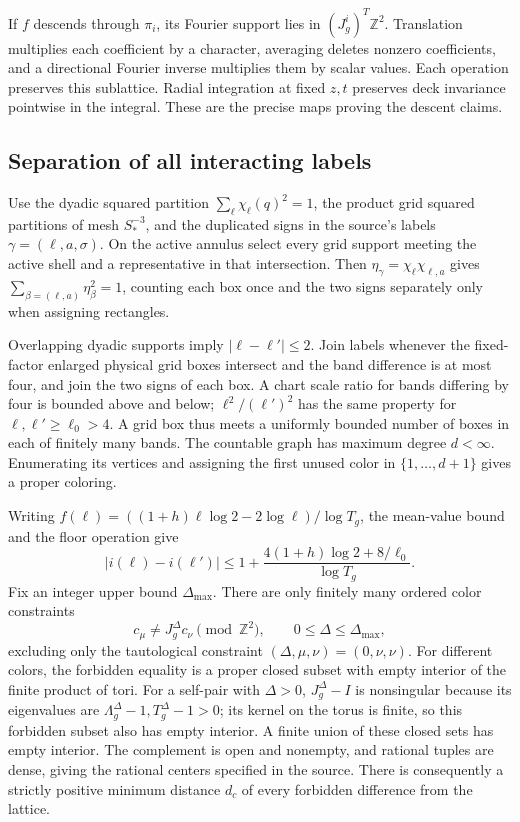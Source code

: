 \documentclass[10pt,a4paper]{article}
\newcounter{none}
\begin{document}
If \(f\) descends through \(\pi_i\), its Fourier support lies in \((J_g^i)^T\mathbb Z^2\). Translation multiplies each coefficient by a character, averaging deletes nonzero coefficients, and a directional Fourier inverse multiplies them by scalar values. Each operation preserves this sublattice. Radial integration at fixed \(z,t\) preserves deck invariance pointwise in the integral. These are the precise maps proving the descent claims.

\subsection{Separation of all interacting labels}\label{separation-of-all-interacting-labels}

Use the dyadic squared partition \(\sum_\ell\chi_\ell(q)^2=1\), the product grid squared partitions of mesh \(S_*^{-3}\), and the duplicated signs in the source's labels \(\gamma=(\ell,a,\sigma)\). On the active annulus select every grid support meeting the active shell and a representative in that intersection. Then \(\eta_\gamma=\chi_\ell\chi_{\ell,a}\) gives \(\sum_{\beta=(\ell,a)}\eta_\beta^2=1\), counting each box once and the two signs separately only when assigning rectangles.

Overlapping dyadic supports imply \(|\ell-\ell'|\le2\). Join labels whenever the fixed-factor enlarged physical grid boxes intersect and the band difference is at most four, and join the two signs of each box. A chart scale ratio for bands differing by four is bounded above and below; \(\ell^2/(\ell')^2\) has the same property for \(\ell,\ell'\ge\ell_0>4\). A grid box thus meets a uniformly bounded number of boxes in each of finitely many bands. The countable graph has maximum degree \(d<\infty\). Enumerating its vertices and assigning the first unused color in \(\{1,\ldots,d+1\}\) gives a proper coloring.

Writing \(f(\ell)=((1+h)\ell\log2-2\log\ell)/\log T_g\), the mean-value bound and the floor operation give \[
|i(\ell)-i(\ell')|\le1+\frac{4(1+h)\log2+8/\ell_0}{\log T_g}.
\] Fix an integer upper bound \(\Delta_{\max}\). There are only finitely many ordered color constraints \[
c_\mu\ne J_g^\Delta c_\nu\pmod {\mathbb Z^2},\qquad0\le\Delta\le\Delta_{\max},
\] excluding only the tautological constraint \((\Delta,\mu,\nu)=(0,\nu,\nu)\). For different colors, the forbidden equality is a proper closed subset with empty interior of the finite product of tori. For a self-pair with \(\Delta>0\), \(J_g^\Delta-I\) is nonsingular because its eigenvalues are \(\Lambda_g^\Delta-1,T_g^\Delta-1>0\); its kernel on the torus is finite, so this forbidden subset also has empty interior. A finite union of these closed sets has empty interior. The complement is open and nonempty, and rational tuples are dense, giving the rational centers specified in the source. There is consequently a strictly positive minimum distance \(d_c\) of every forbidden difference from the lattice.
\end{document}

